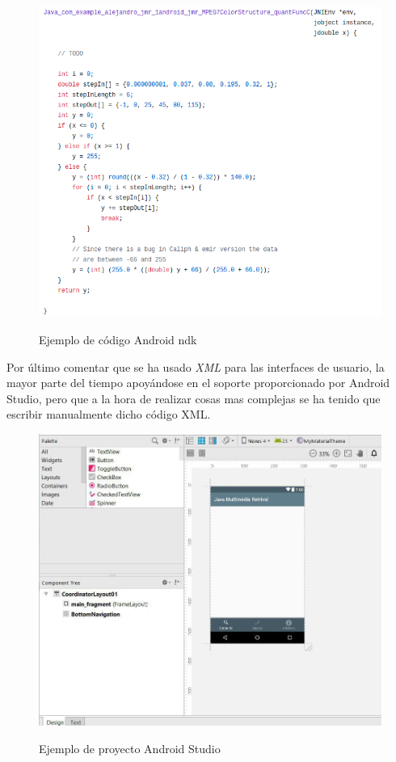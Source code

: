 \begin{figure}[H] %
\centering
\includegraphics[scale=0.6]{imagenes/ndk.png}  %
\label{ndk.png}
\caption{Ejemplo de código Android ndk}
\end{figure}

Por último comentar que se ha usado \textit{XML} para las interfaces de usuario, la mayor parte del tiempo apoyándose en el soporte proporcionado por Android Studio, pero que a la hora de realizar cosas mas complejas se ha tenido que escribir manualmente dicho código XML.

\begin{figure}[H] %
\centering
\includegraphics[scale=0.6]{imagenes/interfaz-android-studio.jpg}  %
\label{interfaz-android-studio.jpg}
\caption{Ejemplo de proyecto Android Studio}
\end{figure}
